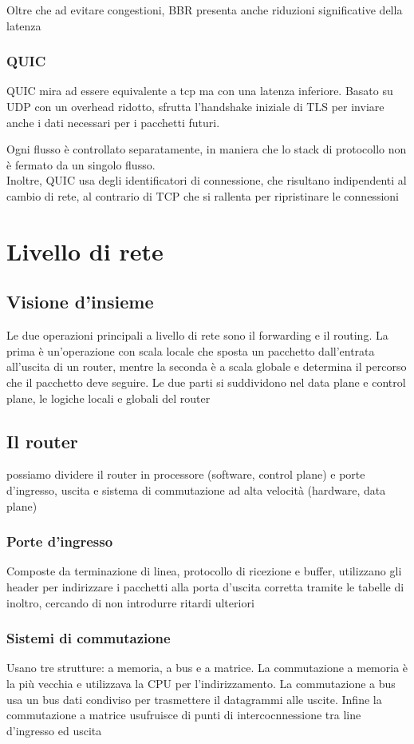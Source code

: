 \documentclass[12pt, a4paper]{article}
\begin{document}
Oltre che ad evitare congestioni, BBR presenta anche riduzioni significative della latenza

\subsubsection{QUIC}
QUIC mira ad essere equivalente a tcp ma con una latenza inferiore. Basato su UDP con un overhead ridotto,
sfrutta l'handshake iniziale di TLS per inviare anche i dati necessari per i pacchetti futuri.

Ogni flusso è controllato separatamente, in maniera che lo stack di protocollo non è fermato da un singolo 
flusso.\\Inoltre, QUIC usa degli identificatori di connessione, che risultano indipendenti al cambio di rete,
al contrario di TCP che si rallenta per ripristinare le connessioni

\newpage
\section{Livello di rete}
\subsection{Visione d'insieme}
Le due operazioni principali a livello di rete sono il forwarding e il routing. La prima è un'operazione con scala
locale che sposta un pacchetto dall'entrata all'uscita di un router, mentre la seconda è a scala globale e
determina il percorso che il pacchetto deve seguire. Le due parti si suddividono nel data plane e control plane,
le logiche locali e globali del router

\subsection{Il router}
possiamo dividere il router in processore (software, control plane) e porte d'ingresso, uscita e sistema di
commutazione ad alta velocità (hardware, data plane)

\subsubsection{Porte d'ingresso}
Composte da terminazione di linea, protocollo di ricezione e buffer, utilizzano gli header per indirizzare
i pacchetti alla porta d'uscita corretta tramite le tabelle di inoltro, cercando di non introdurre ritardi 
ulteriori

\subsubsection{Sistemi di commutazione}
Usano tre strutture: a memoria, a bus e a matrice. La commutazione a memoria è la più vecchia e utilizzava la 
CPU per l'indirizzamento. La commutazione a bus usa un bus dati condiviso per trasmettere il datagrammi alle 
uscite. Infine la commutazione a matrice usufruisce di punti di intercocnnessione tra line d'ingresso ed uscita
\end{document}
